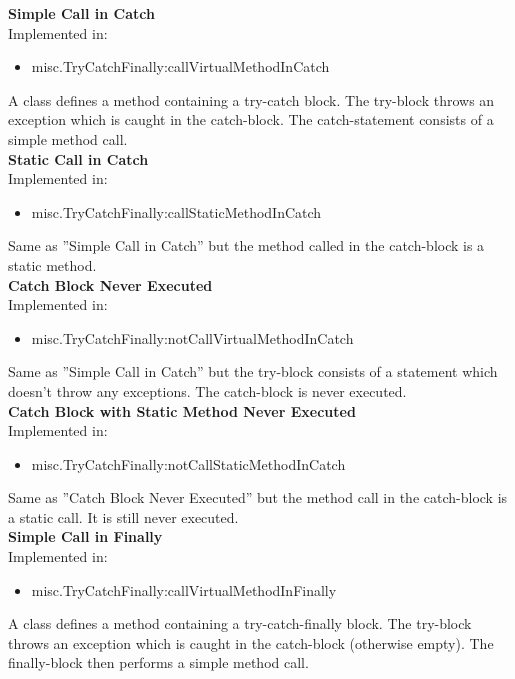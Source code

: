 \documentclass{article}
\begin{document}
\textbf{Simple Call in Catch}\\
Implemented in: 
\begin{itemize}
    \item misc.TryCatchFinally:callVirtualMethodInCatch
\end{itemize}
A class defines a method containing a try-catch block. The try-block throws an exception which is caught in the catch-block. The catch-statement consists of a simple method call.\\

\noindent
\textbf{Static Call in Catch}\\
Implemented in: 
\begin{itemize}
    \item misc.TryCatchFinally:callStaticMethodInCatch
\end{itemize}
Same as ''Simple Call in Catch'' but the method called in the catch-block is a static method.\\

\noindent
\textbf{Catch Block Never Executed}\\
Implemented in: 
\begin{itemize}
    \item misc.TryCatchFinally:notCallVirtualMethodInCatch
\end{itemize}
Same as ''Simple Call in Catch'' but the try-block consists of a statement which doesn't throw any exceptions. The catch-block is never executed.\\

\noindent
\textbf{Catch Block with Static Method Never Executed}\\
Implemented in: 
\begin{itemize}
    \item misc.TryCatchFinally:notCallStaticMethodInCatch
\end{itemize}
Same as ''Catch Block Never Executed'' but the method call in the catch-block is a static call. It is still never executed.\\

\noindent
\textbf{Simple Call in Finally}\\
Implemented in: 
\begin{itemize}
    \item misc.TryCatchFinally:callVirtualMethodInFinally
\end{itemize}
A class defines a method containing a try-catch-finally block. The try-block throws an exception which is caught in the catch-block (otherwise empty). The finally-block then performs a simple method call.\\
\end{document}
